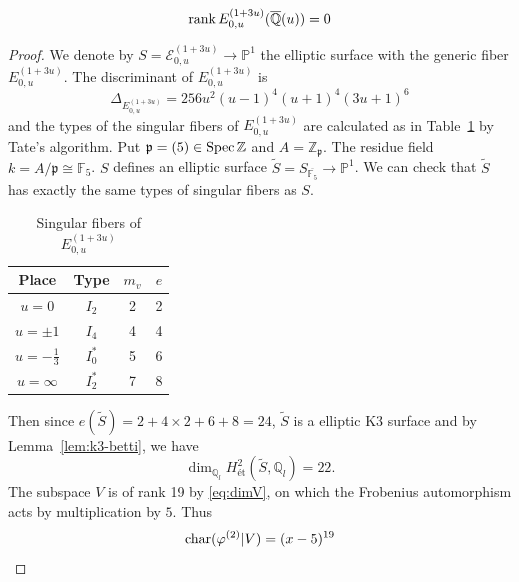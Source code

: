 \documentclass[main]{subfiles}
\begin{document}
\begin{thm}
    \begin{equation*}
        \operatorname{rank} E_{0,u}^{(1 + 3u)}(\overline{\mathbb{Q}}(u)) = 0
    \end{equation*}
\end{thm}
\begin{proof}
    We denote by $S=\mathcal{E}_{0,u}^{(1 + 3u)} \to \mathbb{P}^1$ the elliptic surface with the generic fiber $E_{0,u}^{(1 + 3u)}$.
    The discriminant of $E_{0,u}^{(1 + 3u)}$ is
    \begin{equation*}
        \Delta_{E_{0,u}^{(1 + 3u)}} = 256 u^2 (u - 1)^4 (u + 1)^4 (3u + 1)^6
    \end{equation*}
    and the types of the singular fibers of $E_{0,u}^{(1 + 3u)}$ are calculated as in Table~\ref{tab:E_{0,u}^{(1 + 3u)}} by Tate's algorithm.
    Put $\mathfrak{p}=(5) \in \operatorname{Spec} \mathbb{Z}$ and $A = \mathbb{Z}_{\mathfrak{p}}$.
    The residue field $k=A/\mathfrak{p} \cong \mathbb{F}_{5}$.
    $S$ defines an elliptic surface $\tilde{S} = S_{\overline{\mathbb{F}_{5}}} \to \mathbb{P}^1$.
    We can check that $\tilde{S}$ has exactly the same types of singular fibers as $S$.

    \begin{table}[H]
        \centering
        \caption{Singular fibers of $E_{0,u}^{(1 + 3u)}$}
        \begin{tabular}{|c|c|c|c|}
            \hline
            Place            & Type    & $m_v$ & $e$ \\
            \hline
            $u=0$            & $I_2$   & 2     & 2   \\
            $u=\pm 1$        & $I_4$   & 4     & 4   \\
            $u=-\frac{1}{3}$ & $I_0^*$ & 5     & 6   \\
            $u=\infty$       & $I_2^*$ & 7     & 8   \\
            \hline
        \end{tabular}
        \label{tab:E_{0,u}^{(1 + 3u)}}
    \end{table}
    Then since $e(\tilde{S})=2+4 \times2+6+8=24$, $\tilde{S}$ is a elliptic K3 surface and by Lemma~\ref{lem:k3-betti}, we have
    \begin{equation*}
        \dim_{\mathbb{Q}_{l}} H_{\text{\'et}}^{2}(\tilde{S}, \mathbb{Q}_{l}) = 22.
    \end{equation*}
    The subspace $V$ is of rank 19 by \eqref{eq:dimV}, on which the Frobenius automorphism acts by multiplication by $5$.
    Thus
    \begin{equation*}
        \operatorname{char} (\varphi^{(2)} | V) = (x - 5)^{19}
    \end{equation*}


\end{proof}
\end{document}
